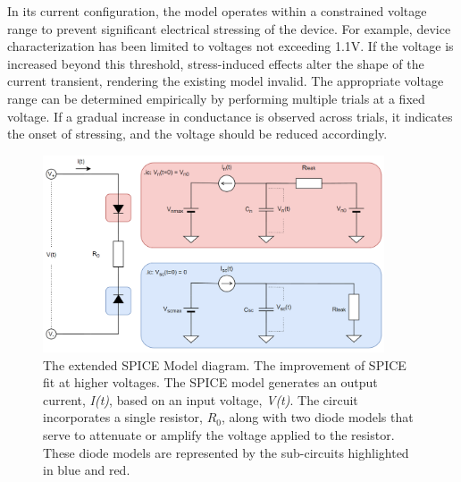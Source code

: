 
\noindent In its current configuration, the model operates within a constrained voltage range to prevent significant electrical stressing of the device. For example, device characterization has been limited to voltages not exceeding 1.1V. If the voltage is increased beyond this threshold, stress-induced effects alter the shape of the current transient, rendering the existing model invalid. The appropriate voltage range can be determined empirically by performing multiple trials at a fixed voltage. If a gradual increase in conductance is observed across trials, it indicates the onset of stressing, and the voltage should be reduced accordingly.\\

\begin{figure}[htbp!] 
    \centering    
    \includegraphics[width=0.9\textwidth]{Chapter5/Figs/h.png}
    \caption[The extended SPICE Model diagram.]{The extended SPICE Model diagram. The improvement of SPICE fit at higher voltages. The SPICE model generates an output current, \textit{I(t)}, based on an input voltage, \textit{V(t)}. The circuit incorporates a single resistor, $R_0$, along with two diode models that serve to attenuate or amplify the voltage applied to the resistor. These diode models are represented by the sub-circuits highlighted in blue and red.}
    \label{fig:5h}
\end{figure}

